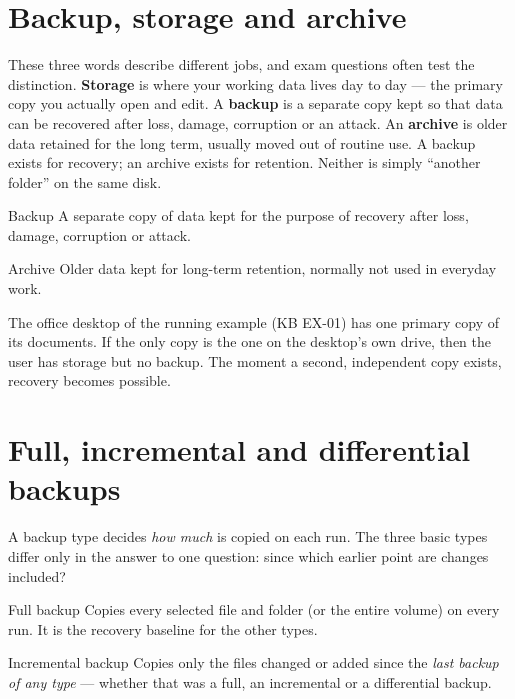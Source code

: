 \section{Backup, storage and archive}
These three words describe different jobs, and exam questions often test the
distinction. \textbf{Storage} is where your working data lives day to day ---
the primary copy you actually open and edit. A \textbf{backup} is a separate
copy kept so that data can be recovered after loss, damage, corruption or an
attack. An \textbf{archive} is older data retained for the long term, usually
moved out of routine use. A backup exists for recovery; an archive exists for
retention. Neither is simply ``another folder'' on the same disk.

\begin{definitionbox}{Backup}
A separate copy of data kept for the purpose of recovery after loss, damage,
corruption or attack.
\end{definitionbox}

\begin{definitionbox}{Archive}
Older data kept for long-term retention, normally not used in everyday work.
\end{definitionbox}

The office desktop of the running example (KB EX-01) has one primary copy of
its documents. If the only copy is the one on the desktop's own drive, then
the user has storage but no backup. The moment a second, independent copy
exists, recovery becomes possible.

\section{Full, incremental and differential backups}
A backup type decides \emph{how much} is copied on each run. The three basic
types differ only in the answer to one question: since which earlier point are
changes included?

\begin{definitionbox}{Full backup}
Copies every selected file and folder (or the entire volume) on every run.
It is the recovery baseline for the other types.
\end{definitionbox}

\begin{definitionbox}{Incremental backup}
Copies only the files changed or added since the \emph{last backup of any
type} --- whether that was a full, an incremental or a differential backup.
\end{definitionbox}

